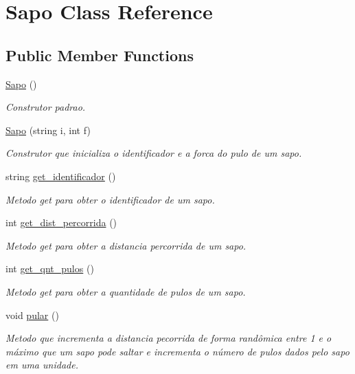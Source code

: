 \hypertarget{classSapo}{}\section{Sapo Class Reference}
\label{classSapo}
\subsection*{Public Member Functions}
\begin{DoxyCompactItemize}
\item 
\mbox{\label{classSapo_a4dfbe2759140ed6903ff3e9389eae2c3}} 
\hyperlink{classSapo_a4dfbe2759140ed6903ff3e9389eae2c3}{Sapo} ()
\begin{DoxyCompactList}\small\item\em Construtor padrao. \end{DoxyCompactList}\item 
\hyperlink{classSapo_a221aae78cfa9b71f5888b1a37e5f80af}{Sapo} (string i, int f)
\begin{DoxyCompactList}\small\item\em Construtor que inicializa o identificador e a forca do pulo de um sapo. \end{DoxyCompactList}\item 
string \hyperlink{classSapo_a69ca03fd4c295dd95db85082f7494f91}{get\+\_\+identificador} ()
\begin{DoxyCompactList}\small\item\em Metodo get para obter o identificador de um sapo. \end{DoxyCompactList}\item 
int \hyperlink{classSapo_a5256452b7012da02582d47d19bfb80f9}{get\+\_\+dist\+\_\+percorrida} ()
\begin{DoxyCompactList}\small\item\em Metodo get para obter a distancia percorrida de um sapo. \end{DoxyCompactList}\item 
int \hyperlink{classSapo_a9b37c7eae22e5a6a9e0a7f8d986a2f99}{get\+\_\+qnt\+\_\+pulos} ()
\begin{DoxyCompactList}\small\item\em Metodo get para obter a quantidade de pulos de um sapo. \end{DoxyCompactList}\item 
\mbox{\label{classSapo_a32e61c61677967120ae652099bd56805}} 
void \hyperlink{classSapo_a32e61c61677967120ae652099bd56805}{pular} ()
\begin{DoxyCompactList}\small\item\em Metodo que incrementa a distancia pecorrida de forma randômica entre 1 e o máximo que um sapo pode saltar e incrementa o número de pulos dados pelo sapo em uma unidade. \end{DoxyCompactList}\end{DoxyCompactItemize}
